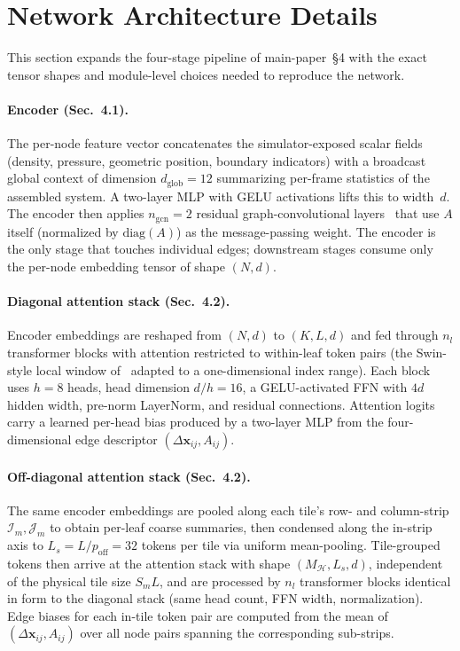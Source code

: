 \documentclass[acmtog]{acmart}
\begin{document}
\section{Network Architecture Details}
\label{supp:architecture}

This section expands the four-stage pipeline of main-paper~\S4 with the exact
tensor shapes and module-level choices needed to reproduce the network.

\paragraph{Encoder (Sec.~4.1).}
The per-node feature vector concatenates the simulator-exposed scalar fields
(density, pressure, geometric position, boundary indicators) with a broadcast
global context of dimension $d_{\mathrm{glob}}\!=\!12$ summarizing per-frame
statistics of the assembled system. A two-layer MLP with GELU activations lifts
this to width~$d$. The encoder then applies $n_{\mathrm{gcn}}\!=\!2$ residual
graph-convolutional layers~\cite{kipf2017semi} that use $A$ itself (normalized by
$\mathrm{diag}(A)$) as the message-passing weight. The encoder is the only stage
that touches individual edges; downstream stages consume only the per-node
embedding tensor of shape $(N, d)$.

\paragraph{Diagonal attention stack (Sec.~4.2).}
Encoder embeddings are reshaped from $(N, d)$ to $(K, L, d)$ and fed through $n_l$
transformer blocks with attention restricted to within-leaf token pairs (the
Swin-style local window of~\cite{Liu2021swin,vaswani2017attention} adapted to a
one-dimensional index range). Each block uses $h\!=\!8$ heads, head dimension
$d/h\!=\!16$, a GELU-activated FFN with $4d$ hidden width, pre-norm LayerNorm, and
residual connections. Attention logits carry a learned per-head bias produced by
a two-layer MLP from the four-dimensional edge descriptor
$(\Delta\mathbf{x}_{ij}, A_{ij})$.

\paragraph{Off-diagonal attention stack (Sec.~4.2).}
The same encoder embeddings are pooled along each tile's row- and column-strip
$\mathcal{I}_m, \mathcal{J}_m$ to obtain per-leaf coarse summaries, then
condensed along the in-strip axis to $L_s\!=\!L/p_{\mathrm{off}}\!=\!32$ tokens
per tile via uniform mean-pooling. Tile-grouped tokens then arrive at the
attention stack with shape $(M_{\mathcal{H}}, L_s, d)$, independent of the
physical tile size $S_mL$, and are processed by $n_l$ transformer blocks
identical in form to the diagonal stack (same head count, FFN width,
normalization). Edge biases for each in-tile token pair are computed from the
mean of $(\Delta\mathbf{x}_{ij}, A_{ij})$ over all node pairs spanning the
corresponding sub-strips.
\end{document}
